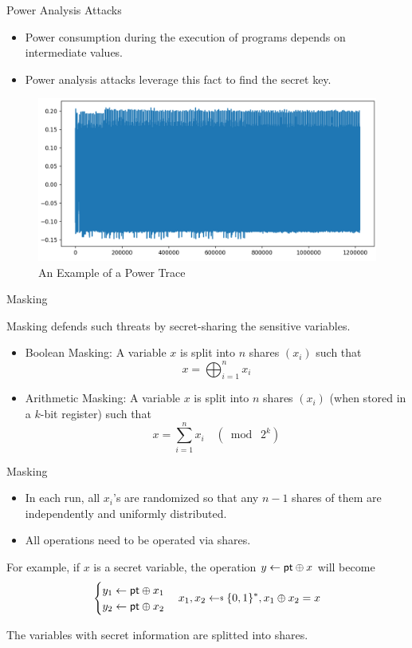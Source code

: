 \begin{frame}{Power Analysis Attacks}

\begin{itemize}
\item Power consumption during the execution of programs depends on intermediate values.
\pause
\item Power analysis attacks leverage this fact to find the secret key. 
\pause
\end{itemize}
\vspace{-4pt}
\begin{figure}
\includegraphics[width=.7\textwidth]{Figure/trace_example_ECC.png}
\vspace{-5pt}
\caption{An Example of a Power Trace}
\end{figure}

\end{frame}



\begin{frame}{Masking}

Masking defends such threats by secret-sharing the sensitive variables.
\pause
\begin{itemize}
	\item Boolean Masking: A variable $x$ is split into $n$ shares $(x_i)$ such that
	\[
	x = \bigoplus_{i=1}^n x_i
	\]
	\pause
	\item Arithmetic Masking: A variable $x$ is split into $n$ shares $(x_i)$ (when stored in a $k$-bit register) such that
	\[
	x = \sum_{i=1}^n x_i \quad (\bmod\; 2^k)
	\]
\end{itemize}

\end{frame}


\begin{frame}{Masking}

\begin{itemize}
\item In each run, all $x_i$'s are randomized so that any $n-1$ shares of them are independently and uniformly distributed.
\pause
\item All operations need to be operated via shares.
\end{itemize}

For example, if $x$ is a secret variable, the operation $y \gets {\sf pt} \oplus x$ will become 
\[
	\begin{cases} y_1 \gets {\sf pt} \oplus x_1 \\ y_2 \gets {\sf pt} \oplus x_2  \end{cases} x_1,x_2 \getsdollar \{0,1\}^*, x_1 \oplus x_2 = x
\]

The variables with secret information are splitted into shares.

\end{frame}


